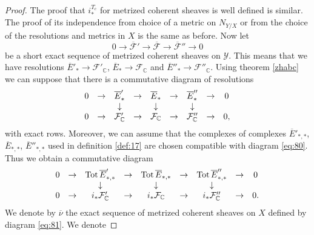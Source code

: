 \documentclass[10pt,twoside]{article}
\numberwithin{equation}{section}
\theoremstyle{plain}
\theoremstyle{definition}
\DeclareMathOperator{\Tot}{Tot}
\begin{document}
\begin{proof}
The proof that $i^{T_{c}}_{\ast}$ for metrized coherent
sheaves is well defined is similar. The proof of its independence from 
choice of a metric 
on $N_{Y/X}$ or from the choice of the resolutions and metrics in $X$
is the same as before. Now let
\begin{displaymath}
  0\longrightarrow \overline{\mathcal{F}}'\longrightarrow 
  \overline{\mathcal{F}} \longrightarrow \overline
  {\mathcal{F}}''\longrightarrow 0 
\end{displaymath}
be a short exact sequence of metrized coherent sheaves on
$\mathcal{Y}$. This means that we have resolutions $\overline
E'_{\ast}\to \mathcal{F}'_{\mathbb{C}} $, $\overline
E_{\ast}\to \mathcal{F}_{\mathbb{C}} $ and $\overline
E''_{\ast}\to \mathcal{F}''_{\mathbb{C}} $. Using theorem \ref{zhabc}
we can suppose that 
there is a commutative diagram of resolutions
\begin{equation}\label{eq:80}
  \begin{array}[h]{ccccccccc}
    0&\rightarrow&\overline E'_{\ast}&\rightarrow&\overline E_{\ast}
    &\rightarrow&\overline E''_{\ast}&\rightarrow&0\\
    &&\downarrow && \downarrow && \downarrow &&\\
    0&\rightarrow& \mathcal{F}'_{\mathbb{C}}
    &\rightarrow& \mathcal{F}_{\mathbb{C}}
    &\rightarrow& \mathcal{F}''_{\mathbb{C}}
    &\rightarrow& 0,
  \end{array}
\end{equation}
with exact rows. Moreover, we can assume 
that the complexes of complexes $\overline
E'_{\ast,\ast}$,
$\overline E_{\ast,\ast}$, $\overline E''_{\ast,\ast}$ used in
definition \ref{def:17} are chosen compatible with diagram
\eqref{eq:80}. Thus we obtain a commutative diagram
\begin{equation}\label{eq:81}
  \begin{array}[h]{ccccccccc}
    0&\rightarrow&\Tot \overline E'_{\ast,\ast}&\rightarrow&\Tot \overline
    E_{\ast, \ast}
    &\rightarrow&\Tot \overline E''_{\ast,\ast}&\rightarrow&0\\
    &&\downarrow && \downarrow && \downarrow &&\\
    0&\rightarrow& i_{\ast}\mathcal{F}'_{\mathbb{C}}
    &\rightarrow& i_{\ast}\mathcal{F}_{\mathbb{C}}
    &\rightarrow& i_{\ast}\mathcal{F}''_{\mathbb{C}}
    &\rightarrow& 0.
  \end{array}
\end{equation}
We denote by $\overline {\nu }$ the exact sequence of metrized
coherent sheaves on $X$ defined by diagram \eqref{eq:81}. We denote

\end{proof}
\end{document}
